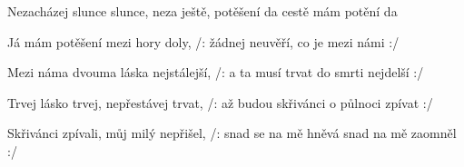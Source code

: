 \begin{TEXT}{Nezacházej slunce}
\SLOKA {} slunce, neza ještě, 
 potěšení  da cestě 
 mám potění  da  

\SLOKA Já mám potěšení mezi hory doly, 
/: žádnej neuvěří, co je mezi námi :/

\SLOKA Mezi náma dvouma láska nejstálejší, 
/: a ta musí trvat do smrti nejdelší :/

\SLOKA Trvej lásko trvej, nepřestávej trvat, 
/: až budou skřivánci o půlnoci zpívat :/

\SLOKA Skřivánci zpívali, můj milý nepřišel,
/: snad se na mě hněvá snad na mě zaomněl :/
\end{TEXT}